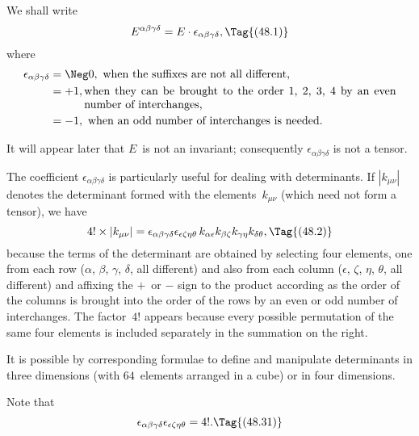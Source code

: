 \documentclass[12pt]{book}
\begin{document}
We shall write
\[
E^{\alpha\beta\gamma\delta} = E \cdot \epsilon_{\alpha\beta\gamma\delta},
\Tag{(48.1)}
\]
where
\begin{align*}
  \epsilon_{\alpha\beta\gamma\delta}
  &= \Neg0, \text{ when the suffixes are not all different,} \\
  &= +1, \parbox[t]{0.8\textwidth}{ when they can be brought to the order $1$, $2$, $3$, $4$ by an even
    number of interchanges,} \\
  &= -1, \text{ when an odd number of interchanges is needed.}
\end{align*}

It will appear later that $E$~is not an invariant; consequently $\epsilon_{\alpha\beta\gamma\delta}$ is not
a tensor.

The coefficient $\epsilon_{\alpha\beta\gamma\delta}$ is particularly useful for dealing with determinants.
If $|k_{\mu\nu}|$ denotes the determinant formed with the elements~$k_{\mu\nu}$ (which need
%
not form a tensor), we have
\[
4! \times |k_{\mu\nu}| = \epsilon_{\alpha\beta\gamma\delta} \epsilon_{\epsilon\zeta\eta\theta}\, k_{\alpha\epsilon} k_{\beta\zeta} k_{\gamma\eta} k_{\delta\theta},
\Tag{(48.2)}
\]
because the terms of the determinant are obtained by selecting four elements,
one from each row ($\alpha$, $\beta$, $\gamma$, $\delta$, all different) and also from each column ($\epsilon$, $\zeta$, $\eta$, $\theta$,
all different) and affixing the $+$~or $-$ sign to the product according as the
order of the columns is brought into the order of the rows by an even or odd
number of interchanges. The factor~$4!$ appears because every possible permutation
of the same four elements is included separately in the summation
on the right.

It is possible by corresponding formulae to define and manipulate determinants
in three dimensions (with $64$~elements arranged in a cube) or in
four dimensions.

Note that
\[
\epsilon_{\alpha\beta\gamma\delta} \epsilon_{\epsilon\zeta\eta\theta} = 4!.
\Tag{(48.31)}
\]
\end{document}
